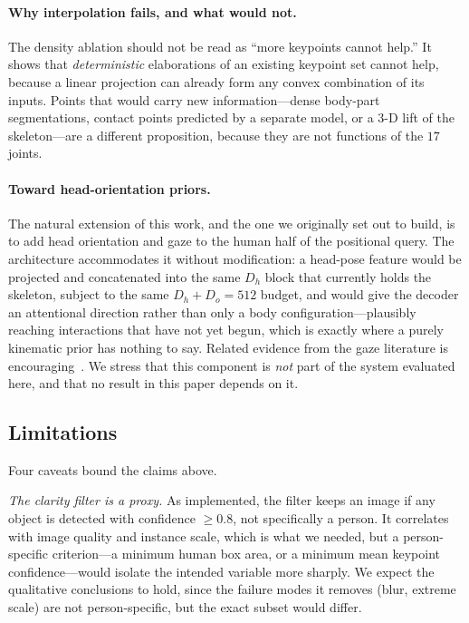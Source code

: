 \documentclass[12pt,a4paper]{article}
\begin{document}
\paragraph{Why interpolation fails, and what would not.} The density ablation
should not be read as ``more keypoints cannot help.'' It shows that
\emph{deterministic} elaborations of an existing keypoint set cannot help,
because a linear projection can already form any convex combination of its
inputs. Points that would carry new information---dense body-part segmentations,
contact points predicted by a separate model, or a 3-D lift of the
skeleton---are a different proposition, because they are not functions of the
$17$ joints.

\paragraph{Toward head-orientation priors.} The natural extension of this work,
and the one we originally set out to build, is to add head orientation and gaze
to the human half of the positional query. The architecture accommodates it
without modification: a head-pose feature would be projected and concatenated
into the same $D_h$ block that currently holds the skeleton, subject to the same
$D_h + D_o = 512$ budget, and would give the decoder an attentional direction
rather than only a body configuration---plausibly reaching interactions that
have not yet begun, which is exactly where a purely kinematic prior has nothing
to say. Related evidence from the gaze literature is
encouraging~\cite{hoigaze,hagi,liu2023horp}. We stress that this component is
\emph{not} part of the system evaluated here, and that no result in this paper
depends on it.

\subsection{Limitations}
\label{sec:limitations}

Four caveats bound the claims above.

\emph{The clarity filter is a proxy.} As implemented, the filter keeps an image
if any object is detected with confidence $\geq 0.8$, not specifically a person.
It correlates with image quality and instance scale, which is what we needed,
but a person-specific criterion---a minimum human box area, or a minimum mean
keypoint confidence---would isolate the intended variable more sharply. We
expect the qualitative conclusions to hold, since the failure modes it removes
(blur, extreme scale) are not person-specific, but the exact subset would
differ.
\end{document}
